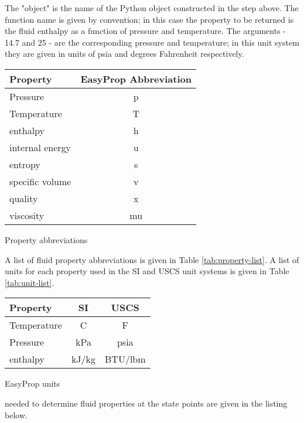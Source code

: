 The "object" is the name of the Python object constructed in the step above.  The function name is given by convention; in this case the property to be returned is the fluid enthalpy as a function of pressure and temperature.  The arguments - 14.7 and 25 - are the corresponding pressure and temperature; in this unit system they are given in units of psia and degrees Fahrenheit respectively.
\begin{margintable}
\begin{tabular}{lc}
\toprule
Property & EasyProp Abbreviation \\
\midrule
Pressure & p \\
Temperature & T \\
enthalpy & h \\
internal energy  & u \\
entropy & s \\
specific volume  & v \\
quality & x \\
viscosity & mu \\
\bottomrule
\end{tabular}
\caption{Property abbreviations}
\label{tab:property-list}
\vspace{0.5cm}
\end{margintable}

A list of fluid property abbreviations is given in Table \ref{tab:property-list}.  A list of units for each property used in the SI and USCS unit systems is given in Table \ref{tab:unit-list}.


\begin{margintable}
\begin{tabular}{lcc}
\toprule
Property & SI & USCS \\
\midrule
Temperature & C & F \\
Pressure & kPa & psia \\
enthalpy & kJ/kg & BTU/lbm \\
\bottomrule
\end{tabular}
\caption{EasyProp units}
\label{tab:unit-list}
\end{margintable}

 needed to determine fluid properties at the state points are given in the listing below.

